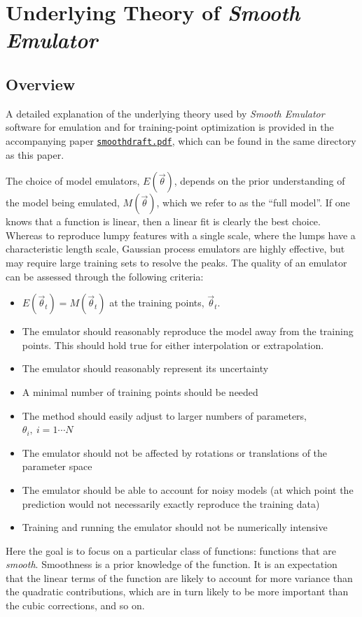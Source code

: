\documentclass[UserManual.tex]{subfiles}
\begin{document}
\section{Underlying Theory of {\it Smooth Emulator}}\label{sec:theory}

\subsection{Overview}

A detailed explanation of the underlying theory used by {\it Smooth Emulator} software for emulation and for training-point optimization is provided in the accompanying paper \href{./smoothdraft.pdf}{{\tt smoothdraft.pdf}}, which can be found in the same directory as this paper.

The choice of model emulators, $E(\vec{\theta})$, depends on the prior understanding of the model being emulated, $M(\vec{\theta})$, which we refer to as the ``full model''. If one knows that  a function is linear, then a linear fit is clearly the best choice. Whereas to reproduce lumpy features with a single scale, where the lumps have a characteristic length scale, Gaussian process emulators are highly effective, but may require large training sets to resolve the peaks. The quality of an emulator can be assessed through the following criteria:
\begin{itemize}\itemsep=0pt
  \item $E(\vec{\theta}_t)=M(\vec{\theta}_t)$ at the training points, $\vec{\theta}_t$. 
  \item The emulator should reasonably reproduce the model away from the training points. This should hold true for either interpolation or extrapolation.
  \item The emulator should reasonably represent its uncertainty
  \item A minimal number of training points should be needed
  \item The method should easily adjust to larger numbers of parameters, $\theta_i,~i=1\cdots N$
  \item The emulator should not be affected by rotations or translations of the parameter space
  \item The emulator should be able to account for noisy models (at which point the prediction would not necessarily exactly reproduce the training data)
  \item Training and running the emulator should not be numerically intensive
\end{itemize}
Here the goal is to focus on a particular class of functions: functions that are {\it smooth}. Smoothness is a prior knowledge of the function. It is an expectation that the linear terms of the function are likely to account for more variance than the quadratic contributions, which are in turn likely to be more important than the cubic corrections, and so on. 
\end{document}
